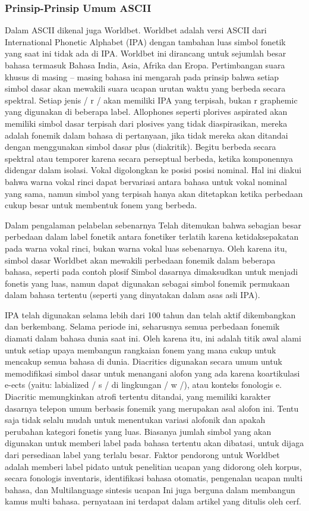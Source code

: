 \begin{enumerate}
		\subsubsection{Prinsip-Prinsip Umum ASCII}
 	Dalam ASCII dikenal juga Worldbet. Worldbet adalah versi ASCII dari  International Phonetic Alphabet (IPA) dengan tambahan luas simbol fonetik yang saat ini tidak ada di IPA. Worldbet ini dirancang untuk sejumlah besar bahasa termasuk Bahasa India, Asia, Afrika dan Eropa. Pertimbangan suara khusus di masing – masing bahasa ini mengarah pada prinsip bahwa setiap simbol dasar akan mewakili suara ucapan urutan waktu yang berbeda secara spektral. Setiap jenis / r / akan memiliki IPA yang terpisah, bukan r graphemic yang digunakan di beberapa label. Allophones seperti plorives aspirated akan memiliki simbol dasar terpisah dari plosives yang tidak diaspirasikan, mereka adalah fonemik dalam bahasa di pertanyaan, jika tidak mereka akan ditandai dengan menggunakan simbol dasar plus (diakritik). Begitu berbeda secara spektral atau temporer karena secara perseptual berbeda, ketika komponennya didengar dalam isolasi. Vokal digolongkan ke posisi posisi nominal. Hal ini diakui bahwa warna vokal rinci dapat bervariasi antara bahasa untuk vokal nominal yang sama, namun simbol yang terpisah hanya akan ditetapkan ketika perbedaan cukup besar untuk membentuk fonem yang berbeda.
 
 	Dalam pengalaman pelabelan sebenarnya Telah ditemukan bahwa sebagian besar perbedaan dalam label fonetik antara fonetiker terlatih karena ketidaksepakatan pada warna vokal rinci, bukan warna vokal luas sebenarnya. Oleh karena itu, simbol dasar Worldbet akan mewakili perbedaan fonemik dalam beberapa bahasa, seperti pada contoh plosif Simbol dasarnya dimaksudkan untuk menjadi fonetis yang luas, namun dapat digunakan sebagai simbol fonemik permukaan dalam bahasa tertentu (seperti yang dinyatakan dalam asas asli IPA).
 
 	IPA telah digunakan selama lebih dari 100 tahun dan telah aktif dikembangkan dan berkembang. Selama periode ini, seharusnya semua perbedaan fonemik diamati dalam bahasa dunia saat ini. Oleh karena itu, ini adalah titik awal alami untuk setiap upaya membangun rangkaian fonem yang mana cukup untuk mencakup semua bahasa di dunia.
 	Diacritics digunakan secara umum untuk memodifikasi simbol dasar untuk menangani alofon yang ada karena koartikulasi e-ects (yaitu: labialized / s / di lingkungan / w /), atau konteks fonologis e. Diacritic memungkinkan atrofi tertentu ditandai, yang memiliki karakter dasarnya telepon umum berbasis fonemik yang merupakan asal alofon ini. Tentu saja tidak selalu mudah untuk menentukan variasi alofonik dan apakah perubahan kategori fonetis yang luas. Biasanya jumlah simbol yang akan digunakan untuk memberi label pada bahasa tertentu akan dibatasi, untuk dijaga dari persediaan label yang terlalu besar. Faktor pendorong untuk Worldbet adalah memberi label pidato untuk penelitian ucapan yang didorong oleh korpus, secara fonologis inventaris, identifikasi bahasa otomatis, pengenalan ucapan multi bahasa, dan Multilanguage sintesis ucapan Ini juga berguna dalam membangun kamus multi bahasa. pernyataan ini terdapat dalam artikel yang ditulis oleh cerf. \cite{cerf1969ascii}


\end{enumerate}
